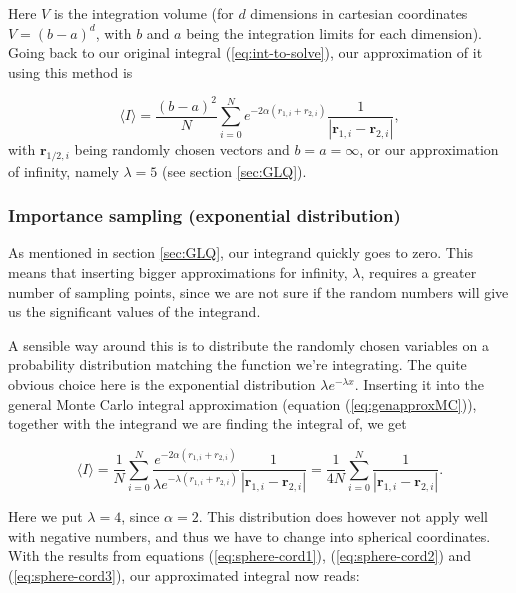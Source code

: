 \documentclass[../main.tex]{subfiles}
\begin{document}
Here $V$ is the integration volume (for $d$ dimensions in cartesian coordinates $V=(b-a)^d$, with $b$ and $a$ being the integration limits for each dimension). Going back to our original integral (\ref{eq:int-to-solve}), our approximation of it using this method is

\begin{equation}
  \langle I \rangle = \frac{(b-a)^2}{N}\sum_{i=0}^Ne^{-2\alpha(r_{1,i}+r_{2,i})}\frac{1}{|\mathbf r_{1,i}-\mathbf r_{2,i}|},
  \label{eq:naive-approx}
\end{equation}
with $\mathbf r_{1/2,i}$ being randomly chosen vectors and $b=a=\infty$, or our approximation of infinity, namely $\lambda = 5$ (see section \ref{sec:GLQ}).

\subsubsection{Importance sampling (exponential distribution)} \label{sec:improvedMC}

As mentioned in section \ref{sec:GLQ}, our integrand quickly goes to zero. This means that inserting bigger approximations for infinity, $\lambda$, requires a greater number of sampling points, since we are not sure if the random numbers will give us the significant values of the integrand.

A sensible way around this is to distribute the randomly chosen variables on a probability distribution matching the function we're integrating. The quite obvious choice here is the exponential distribution $\lambda e^{-\lambda x}$. Inserting it into the general Monte Carlo integral approximation (equation (\ref{eq:genapproxMC})), together with the integrand we are finding the integral of, we get

\begin{equation*}
  \langle I \rangle =\frac{1}{N}\sum_{i=0}^N\frac{e^{-2\alpha(r_{1,i}+r_{2,i})}}{\lambda e^{-\lambda(r_{1,i}+r_{2,i})}}\frac{1}{|\mathbf r_{1,i}-\mathbf r_{2,i}|}=\frac{1}{4N}\sum_{i=0}^N\frac{1}{|\mathbf r_{1,i} - \mathbf r_{2,i}|}.
\end{equation*}

Here we put $\lambda=4$, since $\alpha=2$. This distribution does however not apply well with negative numbers, and thus we have to change into spherical coordinates. With the results from equations (\ref{eq:sphere-cord1}), (\ref{eq:sphere-cord2}) and (\ref{eq:sphere-cord3}), our approximated integral now reads:
\end{document}
